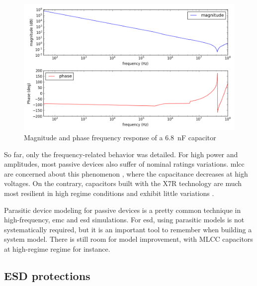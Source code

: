 \begin{figure}[!h]
  \centering
  \includegraphics[width=\textwidth]{src/2/figures/capa_hf_response.png}
  \caption{Magnitude and phase frequency response of a \SI{6.8}{\nano\farad} capacitor}
  \label{fig:frequency-response-capa}
\end{figure}


So far, only the frequency-related behavior was detailed.
For high power and amplitudes, most passive devices also suffer of nominal ratings variations.
\gls{mlcc} are concerned about this phenomenon \cite{capa-esd-cz}, where the capacitance decreases at high voltages.
On the contrary, capacitors built with the X7R technology are much most resilient in high regime conditions and exhibit little variations \cite{fabien-capas}.

Parasitic device modeling for passive devices is a pretty common technique in high-frequency, \gls{emc} and \gls{esd} simulations.
For \gls{esd}, using parasitic models is not systematically required, but it is an important tool to remember when building a system model.
There is still room for model improvement, with MLCC capacitors at high-regime regime for instance.

\subsection{ESD protections}
\label{esd-protection-modelling}

